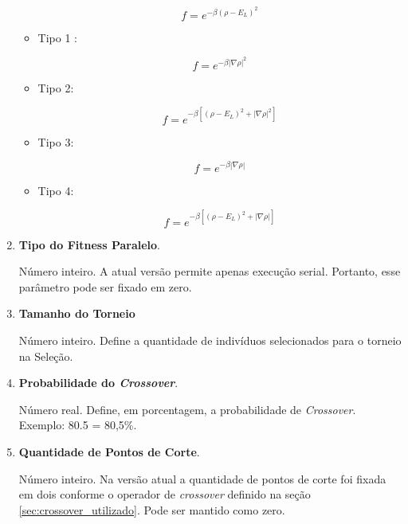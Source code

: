 \begin{enumerate}
\begin{itemize}
					\begin{equation}
					f = e^{-\beta(\rho - E_L)^2}
					\end{equation}
				
				\item Tipo 1 \cite{metodo2004}:
				
					\begin{equation}
					f = e^{-\beta |\nabla \rho|^2}
					\end{equation}
					
				\item Tipo 2:
				
					\begin{equation}
					f = e^{-\beta [(\rho - E_L)^2 + |\nabla \rho|^2]}
					\end{equation}
					
				\item Tipo 3:
				
					\begin{equation}
					f = e^{-\beta |\nabla \rho|}
					\end{equation}
		
			\item Tipo 4:
				
					\begin{equation}
					f = e^{-\beta [(\rho - E_L)^2 + |\nabla \rho|]}
					\end{equation}
			\end{itemize}
			
		\item \textbf{Tipo do Fitness Paralelo}.
		
				Número inteiro. A atual versão permite apenas execução serial. Portanto, esse parâmetro pode ser fixado em zero.
		
		\item \textbf{Tamanho do Torneio}
		
			Número inteiro. Define a quantidade de indivíduos selecionados para o torneio na Seleção.
		
		\item \textbf{Probabilidade do \emph{Crossover}}.
		
			Número real. Define, em porcentagem, a probabilidade de \emph{Crossover}. Exemplo: 80.5 = 80,5\%.
		
		\item \textbf{Quantidade de Pontos de Corte}.
		
			Número inteiro. Na versão atual a quantidade de pontos de corte foi fixada em dois conforme o operador de \emph{crossover} definido na seção \ref{sec:crossover_utilizado}. Pode ser mantido como zero.
		

\end{enumerate}
